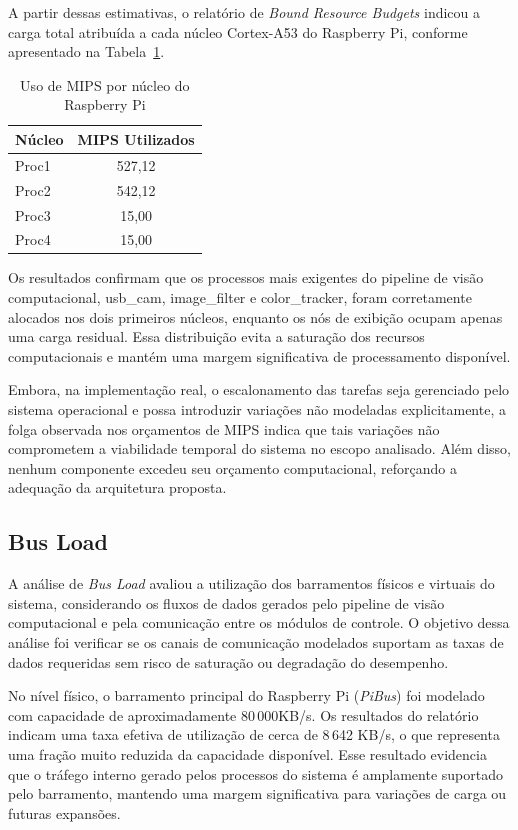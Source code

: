 A partir dessas estimativas, o relatório de \textit{Bound Resource Budgets} indicou a carga total atribuída a cada núcleo Cortex-A53 do Raspberry Pi, conforme apresentado na Tabela~\ref{tab:mips}.

\begin{table}[H]
\centering
\caption{Uso de MIPS por núcleo do Raspberry Pi}
\label{tab:mips}
\begin{tabular}{l c}
\hline
\textbf{Núcleo} & \textbf{MIPS Utilizados} \\
\hline
Proc1 & 527,12 \\
Proc2 & 542,12 \\
Proc3 & 15,00 \\
Proc4 & 15,00 \\
\hline
\end{tabular}
\end{table}

Os resultados confirmam que os processos mais exigentes do pipeline de visão computacional, usb\_cam, image\_filter e color\_tracker, foram corretamente alocados nos dois primeiros núcleos, enquanto os nós de exibição ocupam apenas uma carga residual. Essa distribuição evita a saturação dos recursos computacionais e mantém uma margem significativa de processamento disponível.

Embora, na implementação real, o escalonamento das tarefas seja gerenciado pelo sistema operacional e possa introduzir variações não modeladas explicitamente, a folga observada nos orçamentos de MIPS indica que tais variações não comprometem a viabilidade temporal do sistema no escopo analisado. Além disso, nenhum componente excedeu seu orçamento computacional, reforçando a adequação da arquitetura proposta.


\subsection{Bus Load}

A análise de \textit{Bus Load} avaliou a utilização dos barramentos físicos e virtuais do sistema, considerando os fluxos de dados gerados pelo pipeline de visão computacional e pela comunicação entre os módulos de controle. O objetivo dessa análise foi verificar se os canais de comunicação modelados suportam as taxas de dados requeridas sem risco de saturação ou degradação do desempenho.

No nível físico, o barramento principal do Raspberry Pi (\textit{PiBus}) foi modelado com capacidade de aproximadamente 80\,000KB/s. Os resultados do relatório indicam uma taxa efetiva de utilização de cerca de 8\,642 KB/s, o que representa uma fração muito reduzida da capacidade disponível. Esse resultado evidencia que o tráfego interno gerado pelos processos do sistema é amplamente suportado pelo barramento, mantendo uma margem significativa para variações de carga ou futuras expansões.

